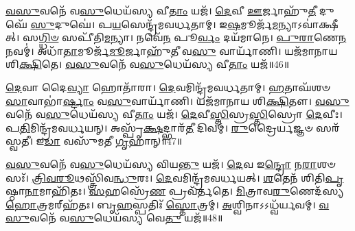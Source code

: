 \-\ul{𑌵}\-\-\ul{𑌸𑍁}\-𑌵𑌨𑍇᳴ 𑌵\-\ul{𑌸𑍁}\-𑌧𑍇𑌯᳴𑌸𑍍𑌯 𑌵𑍀\-\ul{𑌤𑌾𑌂} 𑌯𑌜᳴।
\-\ul{𑌦𑍇}\-𑌵𑍀 \ul{𑌊}\-𑌰𑍍𑌜𑌾𑌹𑍁᳴\-\ul{𑌤𑍀} 𑌦𑍁𑌘𑍇᳴ \ul{𑌸𑍁}\-𑌦𑍁𑌘𑍇॑।
𑌪\-\ul{𑌯}\-𑌸𑍇𑌨𑍍𑌦𑍍𑌰᳴𑌮𑌵𑌰𑍍𑌧𑌤𑌾𑌮𑍍।
𑌇\-\ul{𑌷}\-𑌮𑍂𑌰𑍍𑌜᳴\-\ul{𑌮}\-𑌨𑍍𑌯𑌾\-𑌽𑌵𑌾॑𑌕𑍍𑌷𑍀𑌤𑍍।
𑌸\-\ul{𑌗𑍍𑌧𑌿}\-\-\ul{𑍞} 𑌸𑌪𑍀᳴𑌤𑌿\-\ul{𑌮}\-𑌨𑍍𑌯𑌾।
𑌨𑌵𑍇᳴\-\ul{𑌨} 𑌪𑍂\-\ul{𑌰𑍍𑌵𑌂} 𑌦𑌯᳴𑌮𑌾𑌨𑍇।
\-\ul{𑌪𑍁}\-\-\ul{𑌰𑌾}\-𑌣𑍇\-\ul{𑌨} 𑌨𑌵𑌮𑍍॑।
𑌅𑌧𑌾᳴\-\ul{𑌤𑌾}\-𑌮𑍂𑌰𑍍𑌜᳴\-\ul{𑌮𑍂}\-𑌰𑍍𑌜𑌾𑌹𑍁᳴\-\ul{𑌤𑍀} 𑌵\-\ul{𑌸𑍁} 𑌵𑌾𑌰𑍍𑌯𑌾᳴𑌣𑌿।
𑌯𑌜᳴𑌮𑌾𑌨𑌾𑌯 𑌶𑌿\-\ul{𑌕𑍍𑌷𑌿}\-𑌤𑍇।
\-\ul{𑌵}\-\-\ul{𑌸𑍁}\-𑌵𑌨𑍇᳴ 𑌵\-\ul{𑌸𑍁}\-𑌧𑍇𑌯᳴𑌸𑍍𑌯 𑌵𑍀\-\ul{𑌤𑌾𑌂} 𑌯𑌜᳴॥46॥

\-\ul{𑌦𑍇}\-𑌵𑌾 𑌦𑍈\-\ul{𑌵𑍍𑌯𑌾} 𑌹𑍋𑌤𑌾᳴𑌰𑌾।
\-\ul{𑌦𑍇}\-𑌵𑌮𑌿𑌨𑍍𑌦𑍍𑌰᳴𑌮𑌵𑌰𑍍𑌧𑌤𑌾𑌮𑍍।
\-\ul{𑌹}\-𑌤𑌾𑌘᳴𑌶𑍞\-\ul{𑌸𑌾}\-𑌵𑌾\-𑌭𑌾॑\-\ul{𑌰𑍍𑌷𑍍𑌟𑌾𑌂} 𑌵\-\ul{𑌸𑍁}\-𑌵𑌾𑌰𑍍𑌯𑌾᳴𑌣𑌿।
𑌯𑌜᳴𑌮𑌾𑌨𑌾𑌯 𑌶𑌿\-\ul{𑌕𑍍𑌷𑌿}\-𑌤𑍗।
\-\ul{𑌵}\-\-\ul{𑌸𑍁}\-𑌵𑌨𑍇᳴ 𑌵\-\ul{𑌸𑍁}\-𑌧𑍇𑌯᳴𑌸𑍍𑌯 𑌵𑍀\-\ul{𑌤𑌾𑌂} 𑌯𑌜᳴।
\-\ul{𑌦𑍇}\-𑌵𑍀\-\ul{𑌸𑍍𑌤𑌿}\-𑌸𑍍𑌰\-\ul{𑌸𑍍𑌤𑌿}\-𑌸𑍍𑌰𑍋 \ul{𑌦𑍇}\-𑌵𑍀𑌃।
𑌪\-\ul{𑌤𑌿}\-𑌮𑌿𑌨𑍍𑌦𑍍𑌰᳴𑌮𑌵𑌰𑍍𑌧𑌯𑌨𑍍।
𑌅𑌸𑍍𑌪𑍃᳴\-\ul{𑌕𑍍𑌷}\-𑌦𑍍𑌭𑌾𑌰᳴\-\ul{𑌤𑍀} 𑌦𑌿𑌵𑌮𑍍॑।
\-\ul{𑌰𑍁}\-𑌦𑍍𑌰𑍈𑌰𑍍\mbox{}\-\ul{𑌯}\-𑌜𑍍𑌞𑍞 𑌸𑌰᳴𑌸𑍍𑌵𑌤𑍀।
𑌇\-\ul{𑌡𑌾} 𑌵𑌸𑍁᳴𑌮𑌤𑍀 \ul{𑌗𑍃}\-𑌹𑌾𑌨𑍍॥47॥

\-\ul{𑌵}\-\-\ul{𑌸𑍁}\-𑌵𑌨𑍇᳴ 𑌵\-\ul{𑌸𑍁}\-𑌧𑍇𑌯᳴𑌸𑍍𑌯 𑌵𑌿𑌯\-\ul{𑌨𑍍𑌤𑍁} 𑌯𑌜᳴।
\-\ul{𑌦𑍇}\-𑌵 𑌇\-\ul{𑌨𑍍𑌦𑍍𑌰𑍋} 𑌨\-\ul{𑌰𑌾}\-𑌶𑍞𑌸𑌃᳴।
\-\ul{𑌤𑍍𑌰𑌿}\-\-\ul{𑌵}\-\-\ul{𑌰𑍂}\-𑌥𑌸𑍍𑌤𑍍𑌰𑌿᳴𑌵\-\ul{𑌨𑍍𑌧𑍁}\-𑌰𑌃।
\-\ul{𑌦𑍇}\-𑌵𑌮𑌿𑌨𑍍𑌦𑍍𑌰᳴𑌮𑌵𑌰𑍍𑌧𑌯𑌤𑍍।
\-\ul{𑌶}\-𑌤𑍇𑌨᳴ 𑌶𑌿𑌤𑌿\-\-\ul{𑌪𑍃}\-𑌷𑍍𑌠𑌾\-\ul{𑌨𑌾}\-𑌮𑌾𑌹𑌿᳴𑌤𑌃।
\-\ul{𑌸}\-𑌹𑌸𑍍𑌰𑍇᳴\-\ul{𑌣} 𑌪𑍍𑌰𑌵᳴𑌰𑍍𑌤𑌤𑍇।
\-\ul{𑌮𑌿}\-𑌤𑍍𑌰𑌾𑌵\-\ul{𑌰𑍁}\-𑌣𑍇𑌦᳴𑌸𑍍𑌯 \ul{𑌹𑍋}\-𑌤𑍍𑌰𑌮𑌰𑍍‌\mbox{}𑌹᳴𑌤𑌃।
𑌬𑍃\-\ul{𑌹}\-𑌸𑍍𑌪𑌤𑌿𑌃᳴ \ul{𑌸𑍍𑌤𑍋}\-𑌤𑍍𑌰𑌮𑍍।
\-\ul{𑌅}\-𑌶𑍍𑌵𑌿𑌨𑌾\-𑌽𑌽𑌧𑍍𑌵᳴𑌰𑍍𑌯𑌵𑌮𑍍।
\-\ul{𑌵}\-\-\ul{𑌸𑍁}\-𑌵𑌨𑍇᳴ 𑌵\-\ul{𑌸𑍁}\-𑌧𑍇𑌯᳴𑌸𑍍𑌯 𑌵𑍇\-\ul{𑌤𑍁} 𑌯𑌜᳴॥48॥

